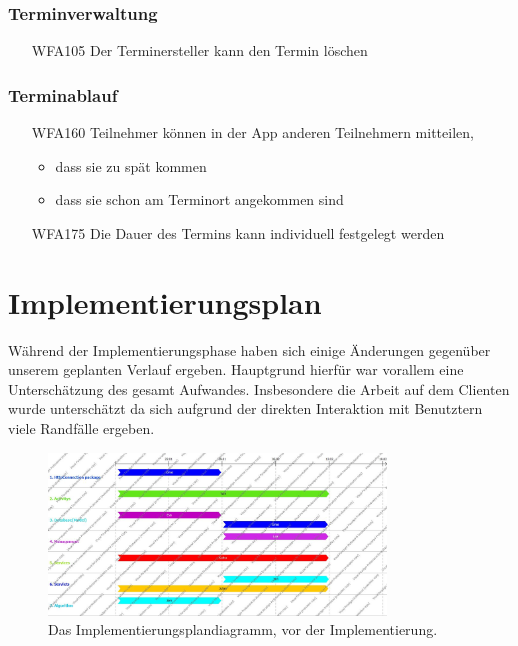 \documentclass{scrartcl}
\begin{document}
	\subsubsection{Terminverwaltung}
	\begin{itemize}
		\item[WFA105] Der Terminersteller kann den Termin löschen	
	\end{itemize}

	\subsubsection{Terminablauf}
	\begin{itemize}
	\item[WFA160] Teilnehmer können in der App anderen Teilnehmern mitteilen,
		\begin{itemize}
			\item dass sie zu spät kommen
			\item dass sie schon am Terminort angekommen sind
		\end{itemize}
			\item[WFA175] Die Dauer des Termins kann individuell festgelegt werden
	\end{itemize}	

	
	\newpage
	\section{Implementierungsplan}
	Während der Implementierungsphase haben sich einige Änderungen gegenüber unserem geplanten Verlauf ergeben.
	Hauptgrund hierfür war vorallem eine Unterschätzung des gesamt Aufwandes. Insbesondere die Arbeit auf dem Clienten wurde unterschätzt da sich aufgrund der direkten Interaktion mit Benutztern viele Randfälle ergeben.
	

	\begin{figure}[h]
		\centering
		\includegraphics[width=0.8\textwidth]{ImplementationPlanDiagram.jpg}
		\caption{Das Implementierungsplandiagramm, vor der Implementierung.}
	\end{figure}
\end{document}
